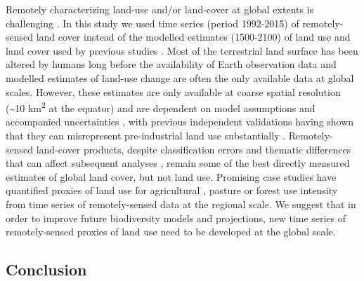 Remotely characterizing land-use and/or land-cover at global extents is challenging \citep{VERBURG2011,Kuemmerle2013}. In this study we used time series (period 1992-2015) of remotely-sensed land cover instead of the modelled estimates (1500-2100) of land use and land cover \citep{Hurtt2011,KleinGoldewijk2016} used by previous studies \citep{Newbold2015,Newbold2016b,DePalma2017}. Most of the terrestrial land surface has been altered by humans long before the availability of Earth observation data \citep{Ellis2010} and modelled estimates of land-use change are often the only available data at global scales. However, these estimates are only available at coarse spatial resolution (\textasciitilde 10 km\textsuperscript{2} at the equator) and are dependent on model assumptions and accompanied uncertainties \citep{Gaillard2010,KleinGoldewijk2013}, with previous independent validations having shown that they can misrepresent pre-industrial land use substantially \citep{Kaplan2017}. Remotely-sensed land-cover products, despite classification errors and thematic differences that can affect subsequent analyses \citep{Sexton2015,Estes2018}, remain some of the best directly measured estimates of global land cover, but not land use. Promising case studies have quantified proxies of land use for agricultural \citep{Estel2015}, pasture \citep{Rufin2015} or forest use intensity \citep{Pflugmacher2012} from time series of remotely-sensed data at the regional scale. We suggest that in order to improve future biodiversity models and projections, new time series of remotely-sensed proxies of land use need to be developed at the global scale. 

\subsection{Conclusion}
\label{C04_0403}

